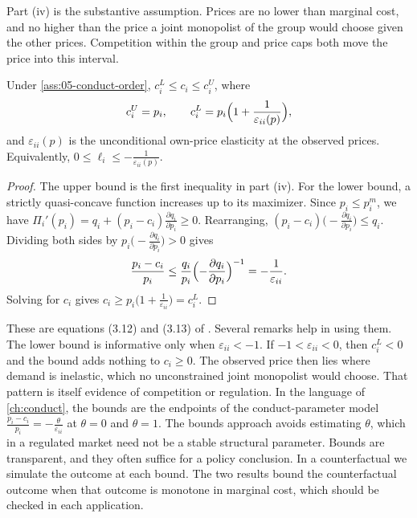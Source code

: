 Part (iv) is the substantive assumption. Prices are no lower than marginal cost, and no higher than the price a
joint monopolist of the group would choose given the other prices. Competition within the group and price
caps both move the price into this interval.

\begin{proposition}\label{prop:05-cost-bounds}
Under \cref{ass:05-conduct-order}, $c_i^L \le c_i \le c_i^U$, where
\begin{equation}\label{eq:05-cost-bounds}
  c_i^U = p_i, \qquad c_i^L = p_i\Bigl(1 + \frac{1}{\varepsilon_{ii}(p)}\Bigr),
\end{equation}
and $\varepsilon_{ii}(p)$ is the unconditional own-price elasticity at the observed prices. Equivalently,
$0 \le \ell_i \le -\frac{1}{\varepsilon_{ii}(p)}$.
\end{proposition}

\begin{proof}
The upper bound is the first inequality in part (iv). For the lower bound, a strictly quasi-concave function
increases up to its maximizer. Since $p_i \le p_i^m$, we have
$\Pi_i'(p_i) = q_i + (p_i - c_i)\frac{\partial q_i}{\partial p_i} \ge 0$. Rearranging,
$(p_i - c_i)\bigl(-\frac{\partial q_i}{\partial p_i}\bigr) \le q_i$. Dividing both sides by
$p_i\bigl(-\frac{\partial q_i}{\partial p_i}\bigr) > 0$ gives
\begin{equation*}
  \frac{p_i - c_i}{p_i} \le \frac{q_i}{p_i}\Bigl(-\frac{\partial q_i}{\partial p_i}\Bigr)^{-1} = -\frac{1}{\varepsilon_{ii}}.
\end{equation*}
Solving for $c_i$ gives $c_i \ge p_i\bigl(1 + \frac{1}{\varepsilon_{ii}}\bigr) = c_i^L$.
\end{proof}

These are equations (3.12) and (3.13) of \citet{ChaudhuriGoldbergJia2006}. Several remarks help in using them.
The lower bound is informative only when $\varepsilon_{ii} < -1$. If $-1 < \varepsilon_{ii} < 0$, then
$c_i^L < 0$ and the bound adds nothing to $c_i \ge 0$. The observed price then lies where demand is inelastic,
which no unconstrained joint monopolist would choose. That pattern is itself evidence of competition or
regulation. In the language of \cref{ch:conduct}, the bounds are the endpoints of the conduct-parameter model
$\frac{p_i - c_i}{p_i} = -\frac{\theta}{\varepsilon_{ii}}$ at $\theta = 0$ and $\theta = 1$. The bounds approach
avoids estimating $\theta$, which in a regulated market need not be a stable structural parameter. Bounds are
transparent, and they often suffice for a policy conclusion. In a counterfactual we simulate the outcome at
each bound. The two results bound the counterfactual outcome when that outcome is monotone in marginal cost,
which should be checked in each application.

